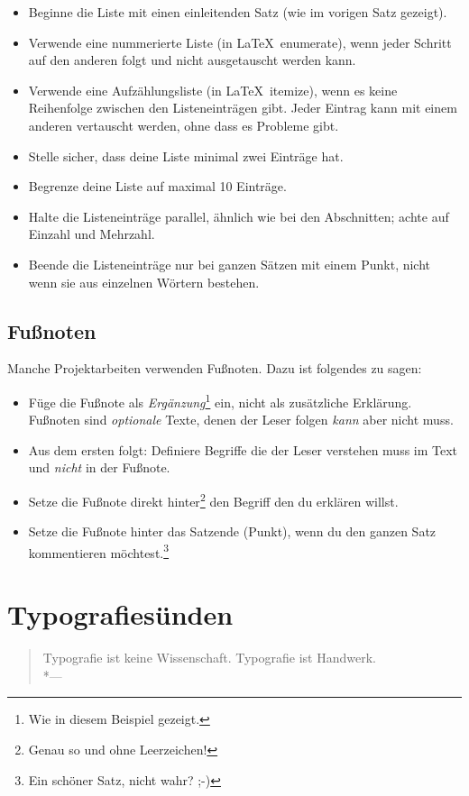 \documentclass[a4paper,titlepage=true,twoside]{scrartcl}
\newcommand{\gquote}[1]{\glqq #1\grqq}
\newcommand{\latexenv}[1]{\textsf{#1}}
\newenvironment{epigraph}[1]%
{\sbox{\Epigraph}{\textit{#1}}
\begin{quote}}%
{%
\\*\hspace{0pt}---\usebox{\Epigraph}%
\end{quote}}
\begin{document}
\begin{itemize}
 \item Beginne die Liste mit einen einleitenden Satz (wie im vorigen Satz gezeigt).
 \item Verwende eine nummerierte Liste (in \LaTeX\ \latexenv{enumerate}), wenn jeder
Schritt auf den anderen folgt und nicht ausgetauscht werden kann.
 \item Verwende eine Aufzählungsliste (in \LaTeX\ \latexenv{itemize}), wenn 
  es keine Reihenfolge zwischen den Listeneinträgen gibt. Jeder Eintrag kann
  mit einem anderen vertauscht werden, ohne dass es Probleme gibt.
 \item Stelle sicher, dass deine Liste minimal zwei Einträge hat.
 \item Begrenze deine Liste auf maximal 10 Einträge.
 \item Halte die Listeneinträge \gquote{parallel}, ähnlich wie bei den Abschnitten; 
  achte auf Einzahl und Mehrzahl.
 \item Beende die Listeneinträge nur bei ganzen Sätzen mit einem Punkt, nicht
  wenn sie aus einzelnen Wörtern bestehen.
\end{itemize}


\subsection{Fußnoten}
Manche Projektarbeiten verwenden Fußnoten. Dazu ist folgendes zu sagen:

\begin{itemize}
 \item Füge die Fußnote als \emph{Ergänzung}\footnote{Wie in diesem Beispiel gezeigt.}
  ein, nicht als zusätzliche Erklärung. Fußnoten sind \emph{optionale} Texte, denen der 
  Leser folgen \emph{kann} aber nicht muss. 
 \item Aus dem ersten folgt: Definiere Begriffe die der Leser verstehen muss im
  Text und \emph{nicht} in der Fußnote.
 \item Setze die Fußnote direkt hinter\footnote{Genau so und ohne Leerzeichen!}
  den Begriff den du erklären willst.
 \item Setze die Fußnote hinter das Satzende (Punkt), wenn du den ganzen Satz
  kommentieren möchtest.\footnote{Ein schöner Satz, nicht wahr? ;-)}
\end{itemize}



\section{Typografiesünden}
\begin{epigraph}{Hans-Peter Willberg}
 Typografie ist keine Wissenschaft. Typografie ist Handwerk.
\end{epigraph}
\end{document}
